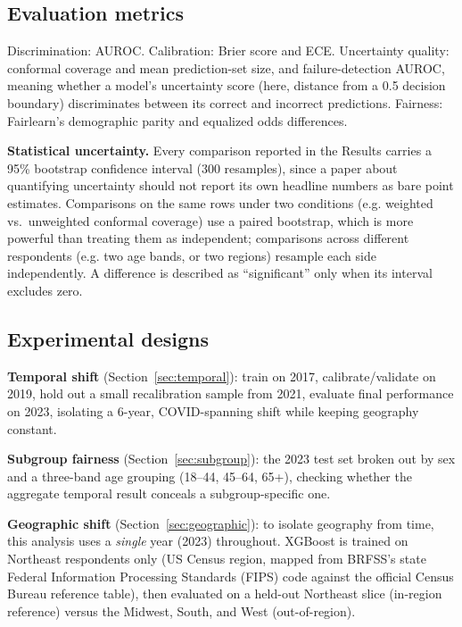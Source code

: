 \documentclass[12pt]{article}
\begin{document}
\subsection{Evaluation metrics}

Discrimination: AUROC. Calibration: Brier score and ECE. Uncertainty quality: conformal coverage and mean prediction-set size, and failure-detection AUROC, meaning whether a model's uncertainty score (here, distance from a 0.5 decision boundary) discriminates between its correct and incorrect predictions. Fairness: Fairlearn's demographic parity and equalized odds differences.

\textbf{Statistical uncertainty.} Every comparison reported in the Results carries a 95\% bootstrap confidence interval (300 resamples), since a paper about quantifying uncertainty should not report its own headline numbers as bare point estimates. Comparisons on the same rows under two conditions (e.g. weighted vs.\ unweighted conformal coverage) use a paired bootstrap, which is more powerful than treating them as independent; comparisons across different respondents (e.g. two age bands, or two regions) resample each side independently. A difference is described as ``significant'' only when its interval excludes zero.

\subsection{Experimental designs}

\textbf{Temporal shift} (Section~\ref{sec:temporal}): train on 2017, calibrate/validate on 2019, hold out a small recalibration sample from 2021, evaluate final performance on 2023, isolating a 6-year, COVID-spanning shift while keeping geography constant.

\textbf{Subgroup fairness} (Section~\ref{sec:subgroup}): the 2023 test set broken out by sex and a three-band age grouping (18--44, 45--64, 65+), checking whether the aggregate temporal result conceals a subgroup-specific one.

\textbf{Geographic shift} (Section~\ref{sec:geographic}): to isolate geography from time, this analysis uses a \emph{single} year (2023) throughout. XGBoost is trained on Northeast respondents only (US Census region, mapped from BRFSS's state Federal Information Processing Standards (FIPS) code against the official Census Bureau reference table), then evaluated on a held-out Northeast slice (in-region reference) versus the Midwest, South, and West (out-of-region).
\end{document}
